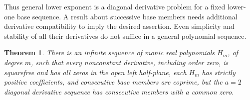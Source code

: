 \documentclass[11pt]{article}
\newtheorem{theorem}{Theorem}
\begin{document}
Thus general lower exponent is a diagonal derivative problem for a
fixed lower-one base sequence. A result about successive base members
needs additional derivative compatibility to imply the desired
assertion. Even simplicity and stability of all their derivatives
do not suffice in a general polynomial sequence.

\begin{theorem}\label{thm:diagonal-obstruction}
There is an infinite sequence of monic real polynomials $H_m$, of
degree $m$, such that every nonconstant derivative, including order zero,
is squarefree and has all zeros in the open left half-plane,
each $H_m$ has strictly positive coefficients, and consecutive base
members are coprime, but the $a=2$ diagonal derivative sequence has
consecutive members with a common zero.
\end{theorem}
\end{document}
